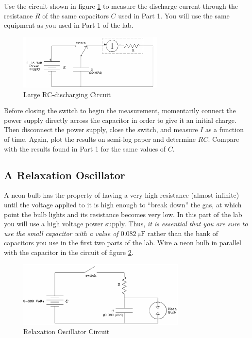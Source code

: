 Use the circuit shown in figure \ref{fig:largercdischarge} to measure the discharge current through the resistance $R$ of the same capacitors $C$ used in Part 1. You will use the same equipment as you used in Part 1 of the lab. \myskip

\begin{figure}[h]
    \begin{center}
        \includegraphics[width=0.65\textwidth]{./Exp4/pic/image7.png}
    \end{center}
    \caption{Large RC-discharging Circuit}
    \label{fig:largercdischarge}
\end{figure}

Before closing the switch to begin the measurement, momentarily connect the power supply directly across the capacitor in order to give it an initial charge. Then disconnect the power supply, close the switch, and measure $I$ as a function of time. Again, plot the results on semi-log paper and determine $RC$. Compare with the results found in Part 1 for the same values of $C$.

\subsection{A Relaxation Oscillator}

A neon bulb has the property of having a very high resistance (almost infinite) until the voltage applied to it is high enough to ``break down'' the gas, at which point the bulb lights and its resistance becomes very low. In this part of the lab you will use a high voltage power supply. Thus, \emph{it is essential that you are sure to use the small capacitor with a value of $0.082\,\mathrm{\mu F}$} rather than the bank of capacitors you use in the first two parts of the lab. Wire a neon bulb in parallel with the capacitor in the circuit of figure \ref{fig:relaxcirc}.\myskip

\begin{figure}[h]
    \begin{center}
        \includegraphics[width=0.75\textwidth]{./Exp4/pic/image8.png}
    \end{center}
    \caption{Relaxation Oscillator Circuit}
    \label{fig:relaxcirc}
\end{figure}

